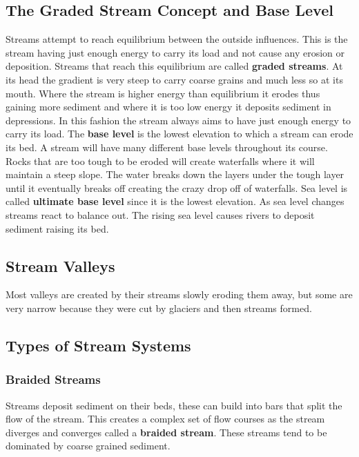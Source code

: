 \documentclass{article}
\begin{document}
\subsection{The Graded Stream Concept and Base Level} %
\label{sub:the_graded_stream_concept_and_base_level}
Streams attempt to reach equilibrium between the outside influences. This is the stream having just enough energy to carry its load and not cause any erosion or deposition. Streams that reach this equilibrium  are called \textbf{graded streams}. At its head the gradient is very steep to carry coarse grains and much less so at its mouth. Where the stream is higher energy than equilibrium it erodes thus gaining more sediment and where it is too low energy it deposits sediment in depressions. In this fashion the stream always aims to have just enough energy to carry its load. The \textbf{base level} is the lowest elevation to which a stream can erode its bed. A stream will have many different base levels throughout its course. Rocks that are too tough to be eroded will create waterfalls where it will maintain a steep slope. The water breaks down the layers under the tough layer until it eventually breaks off creating the crazy drop off of waterfalls. Sea level is called \textbf{ultimate base level} since it is the lowest elevation. As sea level changes streams react to balance out. The rising sea level causes rivers to deposit sediment raising its bed.

\subsection{Stream Valleys} %
\label{sub:stream_valleys}
Most valleys are created by their streams slowly eroding them away, but some are very narrow because they were cut by glaciers and then streams formed.

\subsection{Types of Stream Systems} %
\label{sub:types_of_stream_systems}
\subsubsection{Braided Streams} %
\label{ssub:braided_streams}
Streams deposit sediment on their beds, these can build into bars that split the flow of the stream. This creates a complex set of flow courses as the stream diverges and converges called a \textbf{braided stream}. These streams tend to be dominated by coarse grained sediment.
\end{document}
